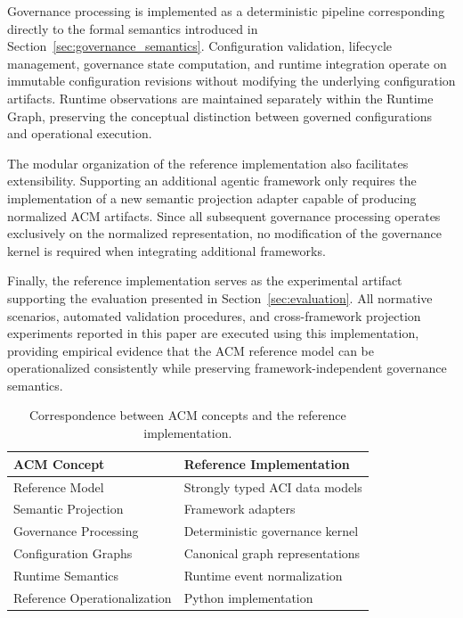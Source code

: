 \documentclass[10pt]{article}
\begin{document}
Governance processing is implemented as a deterministic pipeline corresponding directly to the formal semantics introduced in Section~\ref{sec:governance_semantics}. Configuration validation, lifecycle management, governance state computation, and runtime integration operate on immutable configuration revisions without modifying the underlying configuration artifacts. Runtime observations are maintained separately within the Runtime Graph, preserving the conceptual distinction between governed configurations and operational execution.

The modular organization of the reference implementation also facilitates extensibility. Supporting an additional agentic framework only requires the implementation of a new semantic projection adapter capable of producing normalized ACM artifacts. Since all subsequent governance processing operates exclusively on the normalized representation, no modification of the governance kernel is required when integrating additional frameworks.

Finally, the reference implementation serves as the experimental artifact supporting the evaluation presented in Section~\ref{sec:evaluation}. All normative scenarios, automated validation procedures, and cross-framework projection experiments reported in this paper are executed using this implementation, providing empirical evidence that the ACM reference model can be operationalized consistently while preserving framework-independent governance semantics.

\begin{table}[ht]
\centering
\caption{Correspondence between ACM concepts and the reference implementation.}
\label{tab:implementation_mapping}
\begin{tabular}{ll}
\toprule
\textbf{ACM Concept} & \textbf{Reference Implementation} \\
\midrule
Reference Model & Strongly typed ACI data models \\
Semantic Projection & Framework adapters \\
Governance Processing & Deterministic governance kernel \\
Configuration Graphs & Canonical graph representations \\
Runtime Semantics & Runtime event normalization \\
Reference Operationalization & Python implementation \\
\bottomrule
\end{tabular}
\end{table}
\end{document}
